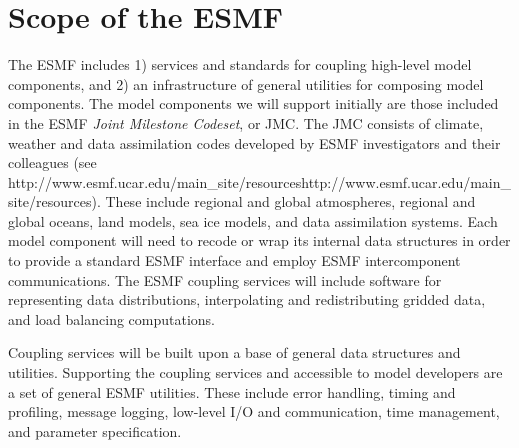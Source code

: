 \section{Scope of the ESMF}
\label{sec:shortscope}
The ESMF includes 1) services and standards for coupling high-level model components,
and 2) an infrastructure of general utilities for composing model components.  The model
components we will support initially are those included in the ESMF {\it Joint Milestone Codeset}, 
or JMC.  The JMC consists of climate, weather and data assimilation codes developed by 
ESMF investigators and their colleagues (see \htmladdnormallink
{http://www.esmf.ucar.edu/main\_site/resources}{http://www.esmf.ucar.edu/main\_site/resources}).  
These include regional and global atmospheres, regional and global oceans, land models, 
sea ice models, and data assimilation 
systems.  Each model component will need to recode or wrap its internal data structures in 
order to provide a standard ESMF interface and employ ESMF intercomponent communications.  
The ESMF coupling services will include software for representing data distributions, 
interpolating and redistributing gridded data, and load balancing computations.

Coupling services will be built upon a base of general data structures and utilities.  Supporting the coupling services and accessible to model developers are a set of 
general ESMF utilities.  These include error handling, timing and profiling, 
message logging, low-level I/O and communication, time management, and parameter 
specification.









